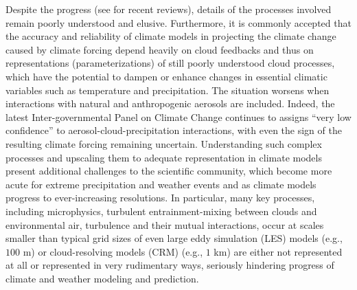 \documentclass[draft,jgrga]{AGUTeX}
\begin{document}
\begin{article}
Despite the progress (see \cite{Devenish2012, GrabowskiWang2013} for recent reviews), details of the processes involved remain poorly understood and elusive. Furthermore, it is commonly accepted that the accuracy and reliability of climate models in projecting the climate change caused by climate forcing depend heavily on cloud feedbacks and thus on representations (parameterizations) of still poorly understood cloud processes, which have the potential to dampen or enhance changes in essential climatic variables such as temperature and precipitation. The situation worsens when interactions with natural and anthropogenic aerosols are included. Indeed, the latest Inter-governmental Panel on Climate Change continues to assigns ``very low confidence'' to aerosol-cloud-precipitation interactions, with even the sign of the resulting climate forcing remaining uncertain. Understanding such complex processes and upscaling them to adequate representation in climate models present additional challenges to the scientific community, which become more acute for extreme precipitation and weather events and as climate models progress to ever-increasing resolutions. In particular, many key processes, including microphysics, turbulent entrainment-mixing between clouds and environmental air, turbulence and their mutual interactions, occur at scales smaller than typical grid sizes of even large eddy simulation (LES) models (e.g., $100$ m) or cloud-resolving models (CRM) (e.g., $1$ km) are either not represented at all or represented in very rudimentary ways, seriously hindering progress of climate and weather modeling and prediction.


\end{article}
\end{document}
